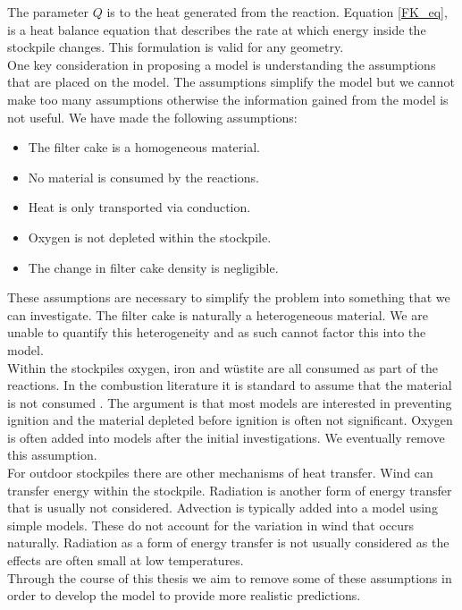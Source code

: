 The parameter $Q$ is to the heat generated from the reaction. Equation \ref{FK_eq}, is a heat balance equation that describes the rate at which energy inside the stockpile changes. This formulation is valid for any geometry.\\
One key consideration in proposing a model is understanding the assumptions that are placed on the model. The assumptions simplify the model but we cannot make too many assumptions otherwise the information gained from the model is not useful. We have made the following assumptions:
\begin{itemize}
\item The filter cake is a homogeneous material.
\item No material is consumed by the reactions.
\item Heat is only transported via conduction.
\item Oxygen is not depleted within the stockpile. 
\item The change in filter cake density is negligible.
\end{itemize}
These assumptions are necessary to simplify the problem into something that we can investigate. The filter cake is naturally a heterogeneous material. We are unable to quantify this heterogeneity and as such cannot factor this into the model. %
\\
Within the stockpiles oxygen, iron and  w\"{u}stite are all consumed as part of the reactions. In the combustion literature it is standard to assume that the material is not consumed \cite{Zhang16}. The argument is that most models are interested in preventing ignition and the material depleted before ignition is often not significant. Oxygen is often added into models after the initial investigations. We eventually remove this assumption.\\
For outdoor stockpiles there are other mechanisms of heat transfer. Wind can transfer energy within the stockpile. Radiation is another form of energy transfer that is usually not considered. Advection is typically added into a model using simple models. These do not account for the variation in wind that occurs naturally. %
Radiation as a form of energy transfer is not usually considered as the effects are often small at low temperatures.\\
Through the course of this thesis we aim to remove some of these assumptions in order to develop the model to provide more realistic predictions.\\
